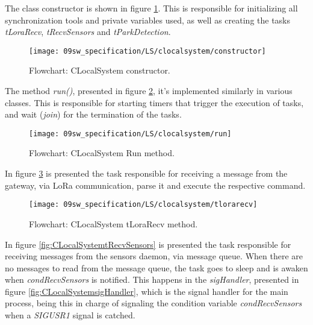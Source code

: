 
The class constructor is shown in figure \ref{fig:CLocalSystemConstructor}. This is responsible for initializing all synchronization tools and private variables used, as well as creating the tasks \textit{tLoraRecv}, \textit{tRecvSensors} and \textit{tParkDetection}.

\begin{figure}[H]
	\centering
	\texttt{[image: 09sw\_specification/LS/clocalsystem/constructor]}
	\caption{Flowchart: CLocalSystem constructor.}
	\label{fig:CLocalSystemConstructor}
\end{figure}

\clearpage
The method \textit{run()}, presented in figure \ref{fig:CLocalSystemRun}, it's implemented similarly in various classes. This is responsible for starting timers that trigger the execution of tasks, and wait (\textit{join}) for the termination of the tasks.

\begin{figure}[H]
	\centering
	\texttt{[image: 09sw\_specification/LS/clocalsystem/run]}
	\caption{Flowchart: CLocalSystem Run method.}
	\label{fig:CLocalSystemRun}
\end{figure}

\clearpage
In figure \ref{fig:CLocalSystemtLoraRecv} is presented the task responsible for receiving a message from the gateway, via LoRa communication, parse it and execute the respective command.

\begin{figure}[H]
	\centering
	\texttt{[image: 09sw\_specification/LS/clocalsystem/tlorarecv]}
	\caption{Flowchart: CLocalSystem tLoraRecv method.}
	\label{fig:CLocalSystemtLoraRecv}
\end{figure}

\clearpage
In figure \ref{fig:CLocalSystemtRecvSensors} is presented the task responsible for receiving messages from the sensors daemon, via message queue. When there are no messages to read from the message queue, the task goes to sleep and is awaken when \textit{condRecvSensors} is notified. This happens in the \textit{sigHandler}, presented in figure \ref{fig:CLocalSystemsigHandler}, which is the signal handler for the main process, being this in charge of signaling the condition variable \textit{condRecvSensors} when a \textit{SIGUSR1} signal is catched. 

